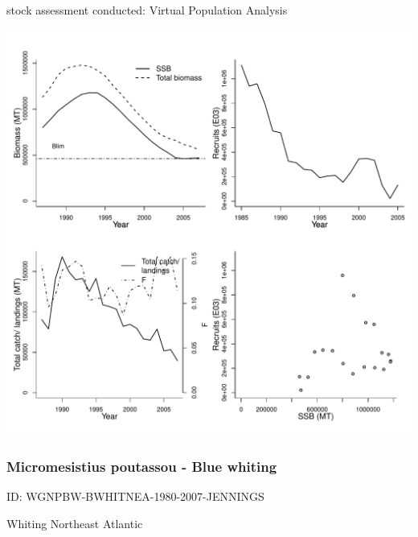 stock assessment conducted: Virtual Population Analysis 
\begin{center}
\vspace{-0.2cm}\includegraphics[scale=0.65]{../tex/figures/plot-INIDEP-SBWHITARGS-1985-2007-Parma.pdf}
\end{center}

\newpage
\subsubsection{Micromesistius poutassou - Blue whiting}
ID: WGNPBW-BWHITNEA-1980-2007-JENNINGS

Whiting Northeast Atlantic 

